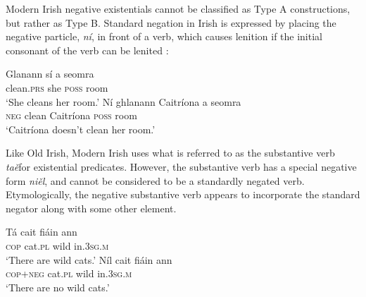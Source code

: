 \documentclass[output=paper]{langsci/langscibook}
\begin{document}
Modern Irish negative existentials cannot be classified as
Type A constructions, but rather as Type B. Standard negation in
Irish is expressed by placing the negative particle, \textit{ní}, in front of a verb, which causes lenition if the initial consonant of the verb can be lenited \citep[86]{Stenson2008}:
%
\begin{exe}\ex
{}
\begin{xlist}
\ex \gll Glanann sí a seomra \\
clean.\textsc{prs}  she \textsc{poss} room \\
    \glt `She cleans her room.' 
\ex\gll Ní ghlanann Caitríona a seomra\\
\textsc{neg} clean        Caitríona  \textsc{poss} room\\
\glt `Caitríona doesn't clean her room.' 
\end{xlist}\end{exe}
%
Like Old Irish, Modern Irish uses what is referred to as the substantive verb \textit{taě}for existential predicates. However, the substantive verb has a special negative form \textit{niěl}, and cannot be considered to be a standardly negated verb. Etymologically, the negative substantive verb appears to incorporate the standard negator along with some other element. 
%
\begin{exe}\ex
{}
\begin{xlist}
\ex \gll Tá cait fiáin ann \\
    \textsc{cop} cat.\textsc{pl} wild in.\textsc{3sg}.\textsc{m} \\
    \glt `There are wild cats.'
\ex\gll Níl cait fiáin ann\\
    \textsc{cop}+\textsc{neg} cat.\textsc{pl} wild in.\textsc{3sg.m}\\
    \glt `There are no wild cats.'
\end{xlist}\end{exe}
\end{document}
